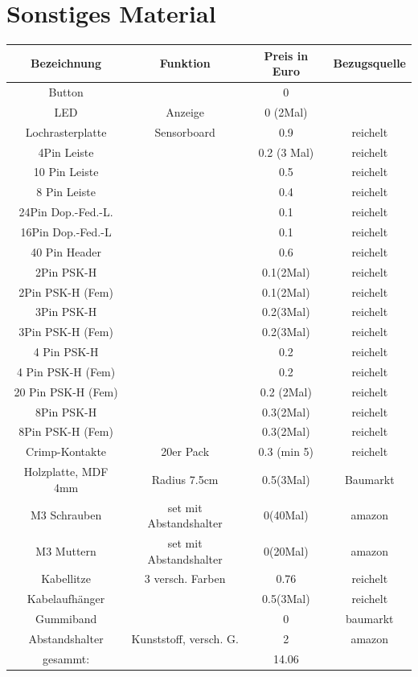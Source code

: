 \documentclass[a4paper,cleardoubleempty,BCOR1cm]{book}
\begin{document}
\section{Sonstiges Material}
\begin{center}
	\begin{tabular}{|c|c|c|c|}
		\hline
		Bezeichnung			&Funktion				& Preis	in Euro			&Bezugsquelle\\
		\hline
		Button				&						& 0				& 		\\
		LED					&Anzeige				& 0 (2Mal)		&		\\
		Lochrasterplatte	&Sensorboard			& 0.9			& reichelt		\\
		4Pin Leiste			& 						& 0.2 (3 Mal)	& reichelt		\\
		10 Pin Leiste		&						& 0.5			& reichelt		\\
		8 Pin Leiste		&						& 0.4			& reichelt		\\
		24Pin Dop.-Fed.-L.	&						& 0.1			& reichelt		\\
		16Pin Dop.-Fed.-L	&						& 0.1			& reichelt		\\
		40 Pin Header		&						& 0.6			& reichelt		\\
		2Pin PSK-H			&						& 0.1(2Mal)		& reichelt	\\
		2Pin PSK-H (Fem)	&						& 0.1(2Mal)		& reichelt	\\
		3Pin PSK-H			&						& 0.2(3Mal)		& reichelt		\\
		3Pin PSK-H (Fem)	&						& 0.2(3Mal)		& reichelt		\\
		4 Pin PSK-H			&						& 0.2			& reichelt\\
		4 Pin PSK-H	(Fem)	&						& 0.2			& reichelt\\
		20 Pin PSK-H	(Fem)&						& 0.2 (2Mal)	& reichelt\\
		8Pin PSK-H			&						& 0.3(2Mal)		& reichelt\\
		8Pin PSK-H (Fem)	&						& 0.3(2Mal)		& reichelt\\
		Crimp-Kontakte		& 20er Pack				& 0.3 (min 5)	& reichelt\\
		Holzplatte, MDF 4mm	& Radius 7.5cm			& 0.5(3Mal)		& Baumarkt		\\
		M3 Schrauben		& set mit Abstandshalter& 0(40Mal)		& amazon		\\
		M3 Muttern			& set mit Abstandshalter& 0(20Mal)		& amazon		\\
		Kabellitze			& 3 versch. Farben		& 0.76			& reichelt		\\
		Kabelaufhänger		&						& 0.5(3Mal)		& reichelt		\\
		Gummiband			&						& 0				& baumarkt\\
		Abstandshalter 		& Kunststoff, versch. G.& 2				& amazon		\\
		\hline
		gesammt: 			&						&14.06			&\\
		\hline
	\end{tabular}
\end{center}
\end{document}
